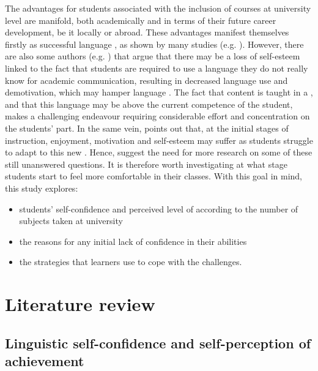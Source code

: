 \documentclass[output=paper]{langsci/langscibook}
\begin{document}
The advantages for students associated with the inclusion of  courses at university level are manifold, both academically and in terms of their future career development, be it locally or abroad. These advantages manifest themselves firstly as successful language , as shown by many studies (e.g. \citealt{CoyleEtAl2010,RuizdeZarobe2011,Pérez-Vidal2013,Gené-GilEtAl2015}). However,  there are also some authors  (e.g. \citealt{Seikkula-Leino2007,Hunt2011,Bruton2013})  that argue that there may be a loss of self-esteem linked to the fact that students are required to use a language they do not really know for academic communication, resulting in decreased language use and demotivation, which may hamper language . The fact that content is taught in a , and that this language may be above the current competence of the student, makes  a challenging endeavour requiring considerable effort and concentration on the students’ part. In the same vein, \citet{Hood2010} points out that, at the initial stages of instruction, enjoyment, motivation and self-esteem may suffer as students struggle to adapt to this new . Hence, \citet{CenozEtAl2014} suggest the need for more research on some of these still unanswered questions. It is therefore worth investigating at what stage students start to feel more comfortable in their  classes. With this goal in mind, this study explores:


\begin{itemize}
\item students’  self-confidence and perceived level of  according to the number of  subjects taken at university
\item the reasons for any initial lack of confidence in their abilities
\item the strategies that learners use to cope with the challenges.
\end{itemize}

\section{Literature review}


\subsection{Linguistic self-confidence and self-perception of  achievement}
\end{document}
